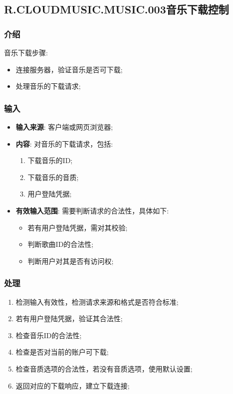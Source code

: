 \subsection{R.CLOUDMUSIC.MUSIC.003音乐下载控制}
\subsubsection{介绍}
	音乐下载步骤:
	\begin{itemize}
		\item 连接服务器，验证音乐是否可下载;
		\item 处理音乐的下载请求;
	\end{itemize}
\subsubsection{输入}
	\begin{itemize}
		\item \textbf{输入来源}: 客户端或网页浏览器;
		\item \textbf{内容}: 对音乐的下载请求，包括: 
		\begin{enumerate}
			\item 下载音乐的ID;
			\item 下载音乐的音质;
			\item 用户登陆凭据;
		\end{enumerate}
		\item \textbf{有效输入范围}: 需要判断请求的合法性，具体如下: 
		\begin{itemize}
			\item 若有用户登陆凭据，需对其校验; 
			\item 判断歌曲ID的合法性;
			\item 判断用户对其是否有访问权;
		\end{itemize}
	\end{itemize}
\subsubsection{处理}
	\begin{enumerate}
		\item 检测输入有效性，检测请求来源和格式是否符合标准;
		\item 若有用户登陆凭据，验证其合法性;
		\item 检查音乐ID的合法性;
		\item 检查是否对当前的账户可下载;
		\item 检查音质选项的合法性，若没有音质选项，使用默认设置;
		\item 返回对应的下载响应，建立下载连接;
	\end{enumerate}

